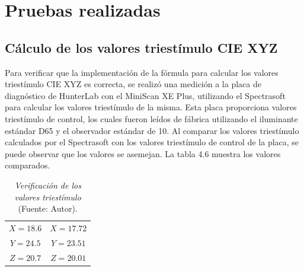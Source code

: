 \newpage

\section{Pruebas realizadas}
	
	\subsection{C\'{a}lculo de los valores triest\'{i}mulo CIE XYZ}
	Para verificar que la implementaci\'{o}n de la f\'{o}rmula para calcular los valores triest\'{i}mulo CIE XYZ	es correcta, se realiz\'{o} una medici\'{o}n a la placa de diagn\'{o}stico de HunterLab con el MiniScan XE Plus, utilizando el Spectrasoft para calcular los valores triest\'{i}mulo de la misma. Esta placa proporciona valores triest\'{i}mulo de control, los cuales fueron le\'{i}dos de f\'{a}brica utilizando el iluminante est\'{a}ndar D65 y el observador est\'{a}ndar de 10\degree. Al comparar los valores triest\'{i}mulo calculados por el Spectrasoft con los valores triest\'{i}mulo de control de la placa, se puede observar que los valores se asemejan. La tabla 4.6 muestra los valores comparados.
	
	\begin{table}[h]
		\small
		\caption[Verificaci\'{o}n de los valores triest\'{i}mulo]{\textit{Verificaci\'{o}n de los valores triest\'{i}mulo} (Fuente: Autor).}
		\centering
		\setlength{\extrarowheight}{\altocelda}
		\begin{tabulary}{\anchotabla}{|c|c|}
			\hline
			 & \\ \hline
			$X = 18.6$ & $X = 17.72$\\ \hline
			$Y = 24.5$ & $Y = 23.51$\\ \hline
			$Z = 20.7$ & $Z = 20.01$\\ \hline
		\end{tabulary}
	\end{table}
	
